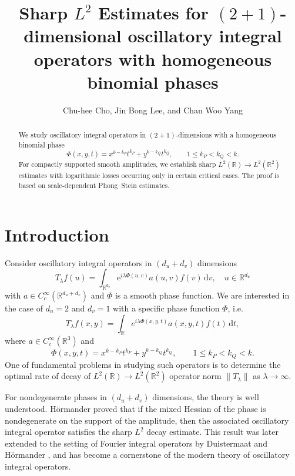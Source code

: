 \documentclass[10pt]{amsart}
\title[Sharp $L^2$ Estimates for binomial phases]
{Sharp $L^2$ Estimates for 
$(2+1)$-dimensional 
oscillatory integral operators with homogeneous
binomial phases}
\author{Chu-hee Cho, Jin Bong Lee, and Chan Woo Yang}
\date{}
\numberwithin{equation}{section}
\theoremstyle{definition}
\theoremstyle{remark}
\theoremstyle{remark}
\newcommand{\R}{\mathbb{R}}
\begin{document}
	
	\begin{abstract}
		
			We study oscillatory integral operators in $(2+1)$-dimensions with a homogeneous binomial phase
			\[
			\Phi(x,y,t)=x^{k-k_P}t^{k_P}+y^{k-k_Q}t^{k_Q},
			\qquad 1\le k_P<k_Q<k.
			\]
			For compactly supported smooth amplitudes, we establish sharp \(L^2(\R)\to L^2(\R^2)\) estimates with logarithmic losses occurring only in certain critical cases. The proof is based on scale-dependent Phong--Stein estimates.

		
	\end{abstract}
	
	\maketitle
	
	\section{Introduction}\label{sec:introduction}
    Consider oscillatory integral operators in $(d_u+d_v)$ dimensions
    \[
        T_\lambda f(u) = \int_{\mathbb R^{d_v}} \mathrm e^{i \lambda\Phi(u,v)} a(u,v) f(v)\,\mathrm dv, \quad u \in \mathbb R^{d_u}
    \]
    with $a\in C_c^\infty(\mathbb R^{d_u+d_v})$ and $\Phi$ is a smooth phase function.
    We are interested in the case of $d_u=2$ and $d_v=1$ with a specific phase function $\Phi$, i.e.
    \[
    T_\lambda f(x,y)=\int_{\mathbb R} e^{i\lambda \Phi(x,y,t)} a(x,y,t)f(t)\,\mathrm dt,
    \]
    where $a\in C_c^\infty(\mathbb R^3)$ and
    \[
    \Phi(x,y,t) = x^{k-k_P}t^{k_P} + y^{k-k_Q}t^{k_Q}, \qquad 1\le k_P<k_Q<k.
    \]
    One of fundamental problems in studying such operators is to determine the optimal rate of decay of $L^2(\mathbb R)\to L^2(\mathbb R^2)$ operator norm $\|T_\lambda\|$ as $\lambda\to\infty$.
 

    For nondegenerate phases in $(d_u+d_v)$ dimensions, the theory is well understood. Hörmander
    \cite{Ho73} proved that if the mixed Hessian of the phase is
    nondegenerate on the support of the amplitude, then the associated
    oscillatory integral operator satisfies the sharp
    $L^2$ decay estimate. This result was later extended to the setting of Fourier integral operators by Duistermaat and Hörmander
    \cite{Ho71,DH72}, and has become a cornerstone of the modern theory of oscillatory integral operators.
\end{document}
